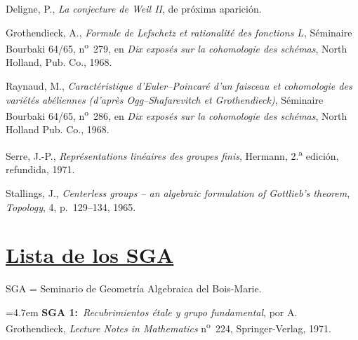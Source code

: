 \clearpage
{}
\setcounter{page}{8}

\begin{enumerate}[label={\textup{[\arabic*]}},leftmargin=3.2em,labelsep=1em,itemsep=1.1em,parsep=0pt,topsep=0pt]
\item Deligne, P., \emph{La conjecture de Weil II}, de pr\'oxima aparici\'on.

\item Grothendieck, A., \emph{Formule de Lefschetz et rationalit\'e des fonctions $L$}, S\'eminaire Bourbaki 64/65, n\textsuperscript{o}~279, en \emph{Dix expos\'es sur la cohomologie des sch\'emas}, North Holland, Pub. Co., 1968.

\item Raynaud, M., \emph{Caract\'eristique d'Euler--Poincar\'e d'un faisceau et cohomologie des vari\'et\'es ab\'eliennes (d'apr\`es Ogg--Shafarevitch et Grothendieck)}, S\'eminaire Bourbaki 64/65, n\textsuperscript{o}~286, en \emph{Dix expos\'es sur la cohomologie des sch\'emas}, North Holland Pub. Co., 1968.

\item Serre, J.-P., \emph{Repr\'esentations lin\'eaires des groupes finis}, Hermann, 2.\textsuperscript{a} edici\'on, refundida, 1971.

\item Stallings, J., \emph{Centerless groups -- an algebraic formulation of Gottlieb's theorem}, \emph{Topology}, 4, p.~129--134, 1965.
\end{enumerate}

\clearpage
\section*{\uline{Lista de los SGA}}

\noindent SGA = Seminario de Geometr\'ia Algebraica del Bois-Marie.

\begingroup
\newcommand{\sgalistentry}[2]{%
  \par\medskip\noindent
  \hangindent=4.7em
  \textbf{#1:}\ #2\par}
\sgalistentry{SGA 1}{\emph{Recubrimientos \'etale y grupo fundamental}, por A. Grothendieck, \emph{Lecture Notes in Mathematics} n\textsuperscript{o}~224, Springer-Verlag, 1971.}

